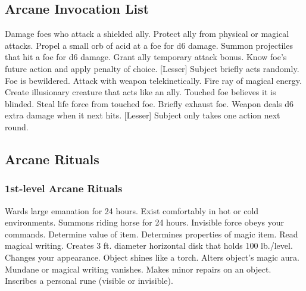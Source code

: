 \subsection{Arcane Invocation List}
\begin{swspelllist}
     Damage foes who attack a shielded ally.
     Protect ally from physical or magical attacks.
     Propel a small orb of acid at a foe for d6 damage.
     Summon projectiles that hit a foe for d6 damage.
     Grant ally temporary attack bonus.
     Know foe's future action and apply penalty of choice.
    [Lesser] Subject briefly acts randomly.
     Foe is bewildered.
     Attack with weapon telekinetically.
     Fire ray of magical energy.
     Create illusionary creature that acts like an ally.
     Touched foe believes it is blinded.
     Steal life force from touched foe.
     Briefly exhaust foe.
     Weapon deals d6 extra damage when it next hits.
    [Lesser] Subject only takes one action next round.
\end{swspelllist}

\subsection{Arcane Rituals}\label{Arcane Rituals}
\subsubsection{1st-level Arcane Rituals}
\begin{rituallist}
     Wards large emanation for 24 hours.
     Exist comfortably in hot or cold environments.
     Summons riding horse for 24 hours.
     Invisible force obeys your commands.
     Determine value of item.
     Determines properties of magic item.
     Read magical writing.
     Creates 3 ft. diameter horizontal disk that holds 100 lb./level.
     Changes your appearance.
     Object shines like a torch.
     Alters object's magic aura.
     Mundane or magical writing vanishes.
     Makes minor repairs on an object.
     Inscribes a personal rune (visible or invisible).
\end{rituallist}

